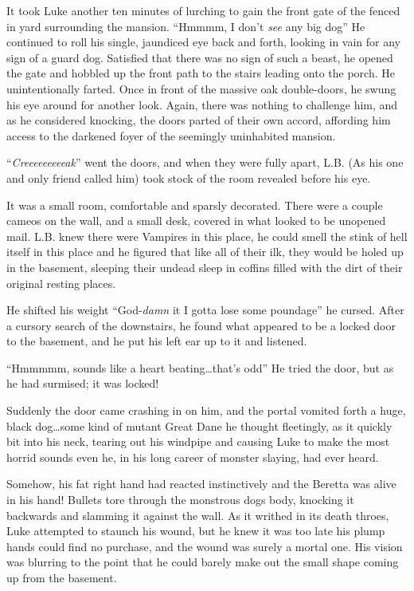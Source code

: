 It took Luke another ten minutes of lurching to gain the front gate of
the fenced in yard surrounding the mansion. ``Hmmmm, I don't {\em see}
any big dog'' He continued to roll his single, jaundiced eye back and
forth, looking in vain for any sign of a guard dog. Satisfied that there
was no sign of such a beast, he opened the gate and hobbled up the front
path to the stairs leading onto the porch. He unintentionally
farted. Once in front of the massive oak double-doors, he swung his eye
around for another look. Again, there was nothing to challenge him, and
as he considered knocking, the doors parted of their own accord,
affording him access to the darkened foyer of the seemingly uninhabited
mansion.

``{\em Creeeeeeeeeak}'' went the doors, and when they were fully apart,
L.B. (As his one and only friend called him) took stock of the room
revealed before his eye.

It was a small room, comfortable and sparsly decorated. There were
a couple cameos on the wall, and a small desk, covered in what
looked to be unopened mail. L.B. knew there were Vampires in this
place, he could smell the stink of hell itself in this place and he
figured that like all of their ilk, they would be holed up in the
basement, sleeping their undead sleep in coffins filled with the
dirt of their original resting places.

He shifted his weight ``God-{\em damn} it I gotta lose some poundage''
he cursed. After a cursory search of the downstairs, he found what
appeared to be a locked door to the basement, and he put his left ear up
to it and listened.

``Hmmmmm, sounds like a heart beating{\ldots}that's odd'' He tried the
door, but as he had surmised; it was locked!

Suddenly the door came crashing in on him, and the portal vomited
forth a huge, black dog{\ldots}some kind of mutant Great Dane he thought
fleetingly, as it quickly bit into his neck, tearing out his
windpipe and causing Luke to make the most horrid sounds even he,
in his long career of monster slaying, had ever heard.

Somehow, his fat right hand had reacted instinctively and the
Beretta was alive in his hand! Bullets tore through the monstrous
dogs body, knocking it backwards and slamming it against the wall.
As it writhed in its death throes, Luke attempted to staunch his
wound, but he knew it was too late his plump hands could find no
purchase, and the wound was surely a mortal one. His vision was
blurring to the point that he could barely make out the small shape
coming up from the basement.

